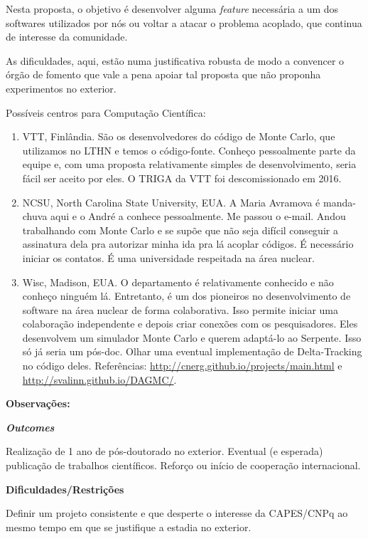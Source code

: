 Nesta proposta, o objetivo é desenvolver alguma \textit{feature} necessária a um 
dos softwares utilizados por nós ou voltar a atacar o problema acoplado, que 
continua de interesse da comunidade.

As dificuldades, aqui, estão numa justificativa robusta de modo a convencer o 
órgão de fomento que vale a pena apoiar tal proposta que não proponha experimentos 
no exterior.

Possíveis centros para Computação Científica:
\begin{enumerate}
	\item VTT, Finlândia. São os desenvolvedores do código de Monte Carlo, que utilizamos no LTHN e temos o código-fonte. Conheço pessoalmente parte da equipe e, 
	com uma proposta relativamente simples de desenvolvimento, seria fácil ser aceito por eles. O TRIGA da VTT foi descomissionado em 2016.
	\item NCSU, North Carolina State University, EUA. A Maria Avramova é manda-chuva aqui e o André a conhece pessoalmente. Me passou o e-mail. Andou trabalhando com Monte Carlo e se supõe que não seja difícil conseguir a assinatura dela pra autorizar minha ida pra lá acoplar códigos. É necessário iniciar os contatos. É uma universidade respeitada na área nuclear.
	\item Wisc, Madison, EUA. O departamento é relativamente conhecido e não conheço ninguém lá. Entretanto, é um dos pioneiros no desenvolvimento de software na área nuclear de forma colaborativa. Isso permite iniciar uma colaboração independente e depois criar conexões com os pesquisadores. Eles desenvolvem um simulador Monte Carlo e querem adaptá-lo ao Serpente. Isso só já seria um pós-doc. Olhar uma eventual implementação de Delta-Tracking no código deles. Referências: \url{http://cnerg.github.io/projects/main.html} e \url{http://svalinn.github.io/DAGMC/}.
	
\end{enumerate}
\textbf{Observações:}



\textbf{\textit{Outcomes}}

Realização de 1 ano de pós-doutorado no exterior. Eventual (e esperada) publicação 
de trabalhos científicos. Reforço ou início de cooperação internacional.

\textbf{Dificuldades/Restrições}

Definir um projeto consistente e que desperte o interesse da CAPES/CNPq ao mesmo 
tempo em que se justifique a estadia no exterior.


